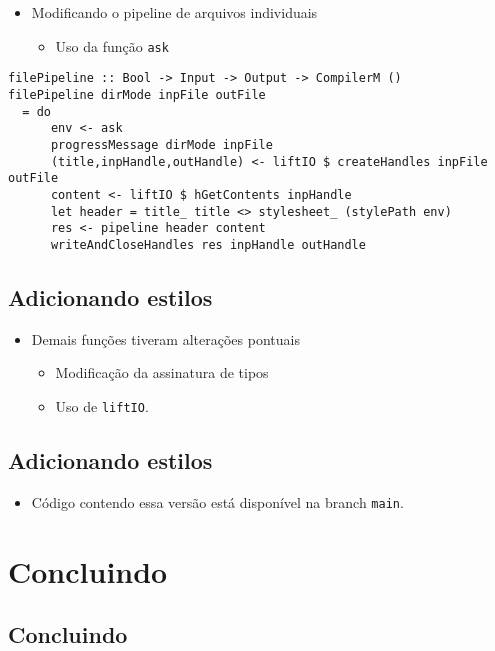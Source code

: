 \documentclass[11pt]{article}
\begin{document}
\begin{itemize}
\item Modificando o pipeline de arquivos individuais
\begin{itemize}
\item Uso da função \texttt{ask}
\end{itemize}
\end{itemize}

\begin{verbatim}
filePipeline :: Bool -> Input -> Output -> CompilerM ()
filePipeline dirMode inpFile outFile 
  = do
      env <- ask
      progressMessage dirMode inpFile
      (title,inpHandle,outHandle) <- liftIO $ createHandles inpFile outFile
      content <- liftIO $ hGetContents inpHandle
      let header = title_ title <> stylesheet_ (stylePath env) 
      res <- pipeline header content
      writeAndCloseHandles res inpHandle outHandle
\end{verbatim}
\subsection*{Adicionando estilos}
\label{sec:orgeba9b3d}

\begin{itemize}
\item Demais funções tiveram alterações pontuais
\begin{itemize}
\item Modificação da assinatura de tipos
\item Uso de \texttt{liftIO}.
\end{itemize}
\end{itemize}
\subsection*{Adicionando estilos}
\label{sec:orgc3ff6f3}

\begin{itemize}
\item Código contendo essa versão está disponível na branch \texttt{main}.
\end{itemize}
\section*{Concluindo}
\label{sec:orgf6d7850}

\subsection*{Concluindo}
\label{sec:orgb27dd83}
\end{document}
